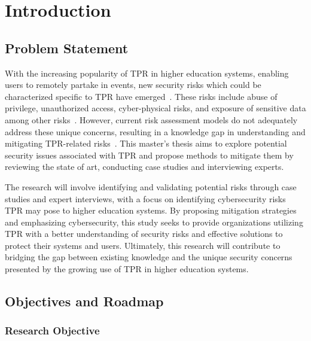 
\newpage
\section{Introduction}


\subsection{Problem Statement}

With the increasing popularity of \ac{TPR} in higher education systems, enabling users to remotely partake in events, new security risks
which could be characterized specific to \ac{TPR} have emerged~\cite{acceptance_telepresence_robots_2022,
  cyber_security_issues_in_robotics_2021,robotics_cyber_security_2022,robot_security_review_2022}.
These risks include abuse of privilege, unauthorized access, cyber-physical risks, and exposure of sensitive data among other risks~\cite[
  120]{robotics_cyber_security_2022}.
However, current risk assessment models do not adequately address these unique concerns, resulting in a knowledge gap in understanding 
and mitigating TPR-related risks~\cite[]{robotics_cyber_security_2022}.
This master's thesis aims to explore potential security issues associated with \ac{TPR} and propose methods to mitigate them by
reviewing the state of art, conducting case studies and interviewing experts.

The research will involve identifying and validating potential risks through case studies and expert interviews, with a focus on identifying
cybersecurity risks \ac{TPR} may pose to higher education systems.
By proposing mitigation strategies and emphasizing cybersecurity, this study seeks to provide organizations utilizing \ac{TPR} with a
better
understanding of security risks and effective solutions to protect their systems and users.
Ultimately, this research will contribute to bridging the gap between existing knowledge and the unique security concerns presented by the
growing use of \ac{TPR} in higher education systems.

\subsection{Objectives and Roadmap}\label{subsec:objectives-and-roadmap}


\subsubsection{Research Objective}

